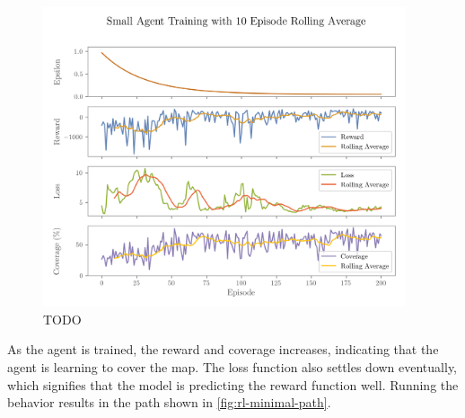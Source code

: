 \begin{figure}[H]
    \centering
    \includegraphics[width=0.95\textwidth]{figures/rl/small-search-agent-training.png}
    \caption{TODO}
    \label{fig:rl-minimal-training}
\end{figure}

As the agent is trained, the reward and coverage increases, indicating that the agent is learning to cover the map. The loss function also settles down eventually, which signifies that the model is predicting the reward function well. Running the behavior results in the path shown in \cref{fig:rl-minimal-path}.


